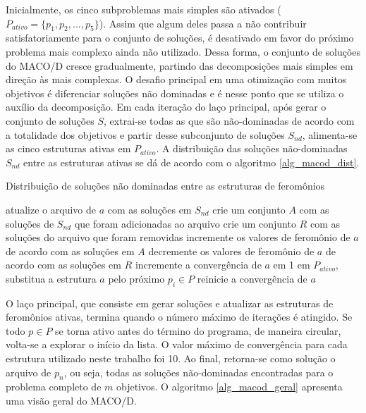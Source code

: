 Inicialmente, os cinco subproblemas mais simples são ativados ($P_{ativo} = \{p_1, p_2, ..., p_5\}$). Assim que algum deles passa a não contribuir satisfatoriamente para o conjunto de soluções, é desativado em favor do próximo problema mais complexo ainda não utilizado. Dessa forma, o conjunto de soluções do MACO/D cresce gradualmente, partindo das decomposições mais simples em direção às mais complexas. O desafio principal em uma otimização com muitos objetivos é diferenciar soluções não dominadas e é nesse ponto que se utiliza o auxílio da decomposição. Em cada iteração do laço principal, após gerar o conjunto de soluções $S$, extrai-se todas as que são não-dominadas de acordo com a totalidade dos objetivos e partir desse subconjunto de soluções $S_{nd}$, alimenta-se as cinco estruturas ativas em $P_{ativo}$. A distribuição das soluções não-dominadas $S_{nd}$ entre as estruturas ativas se dá de acordo com o algoritmo \ref{alg_macod_dist}.

\begin{algorithm}
	\caption{Distribuição de soluções não dominadas entre as estruturas de feromônios}
	\label{alg_macod_dist}
	\begin{algorithmic}[1]
			\State atualize o arquivo de $a$ com as soluções em $S_{nd}$
			\State crie um conjunto $A$ com as soluções de $S_{nd}$ que foram adicionadas ao arquivo
			\State crie um conjunto $R$ com as soluções do arquivo que foram removidas
				\State incremente os valores de feromônio de $a$ de acordo com as soluções em $A$
				\State decremente os valores de feromônio de $a$ de acordo com as soluções em $R$
			\Else
				\State incremente a convergência de $a$ em 1
					\State em $P_{ativo}$, substitua a estrutura $a$ pelo próximo $p_i \in P$
					\State reinicie a convergência de $a$
				\EndIf
			\EndIf
		\EndFor
	\end{algorithmic}
\end{algorithm}

O laço principal, que consiste em gerar soluções e atualizar as estruturas de feromônios ativas, termina quando o número máximo de iterações é atingido. Se todo $p \in P$ se torna ativo antes do término do programa, de maneira circular, volta-se a explorar o início da lista.  O valor máximo de convergência para cada estrutura utilizado neste trabalho foi 10. Ao final, retorna-se como solução o arquivo de $p_n$, ou seja, todas as soluções não-dominadas encontradas para o problema completo de $m$ objetivos. O algoritmo \ref{alg_macod_geral} apresenta uma visão geral do MACO/D.

